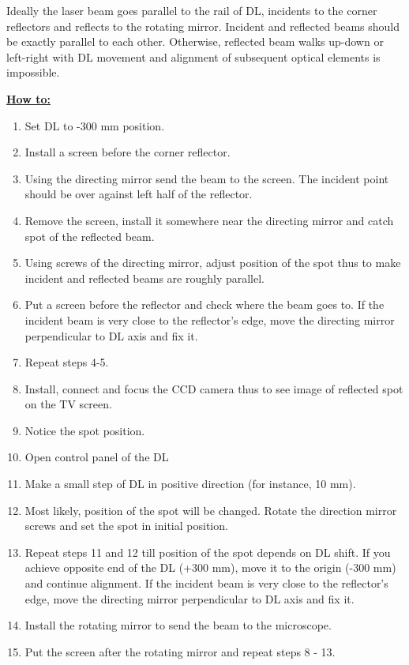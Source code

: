 \documentclass[14pt,a4paper] {article}
\begin{document}

Ideally the laser beam goes parallel to the rail of DL, incidents to the corner reflectors and reflects to the rotating mirror. Incident and reflected beams should be exactly parallel to each other. Otherwise, reflected beam walks up-down or left-right with DL movement and alignment of subsequent optical elements is impossible.   
 
\textbf{\underline{How to:}} 
\begin{enumerate}
\item Set DL to -300 mm position.
\item Install a screen before the corner reflector.
\item Using the directing mirror send the beam to the screen. The incident point should be over against left half of the reflector.
\item Remove the screen, install it somewhere near the directing mirror and catch spot of the reflected beam.
\item Using screws of the directing mirror, adjust position of the spot thus to make incident and reflected beams are roughly parallel.
\item Put a screen before the reflector and check where the beam goes to. If the incident beam is very close to the reflector's edge, move the directing mirror perpendicular to DL axis and fix it.
\item Repeat steps 4-5.
\item Install, connect and focus the CCD camera thus to see image of reflected spot on the TV screen.
\item Notice the spot position.
\item Open control panel of the DL
\item Make a small step of DL in positive direction (for instance, 10 mm).
\item Most likely, position of the spot will be changed. Rotate the direction mirror screws and set the spot in initial position.   
\item Repeat steps 11 and 12 till position of the spot depends on DL shift. If you achieve opposite end of the DL (+300 mm), move it to the origin (-300 mm) and continue alignment. If the incident beam is very close to the reflector's edge, move the directing mirror perpendicular to DL axis and fix it.
\item Install the rotating mirror to send the beam to the microscope.
\item Put the screen after the rotating mirror and repeat steps 8 - 13.
\end{enumerate}
\end{document}
